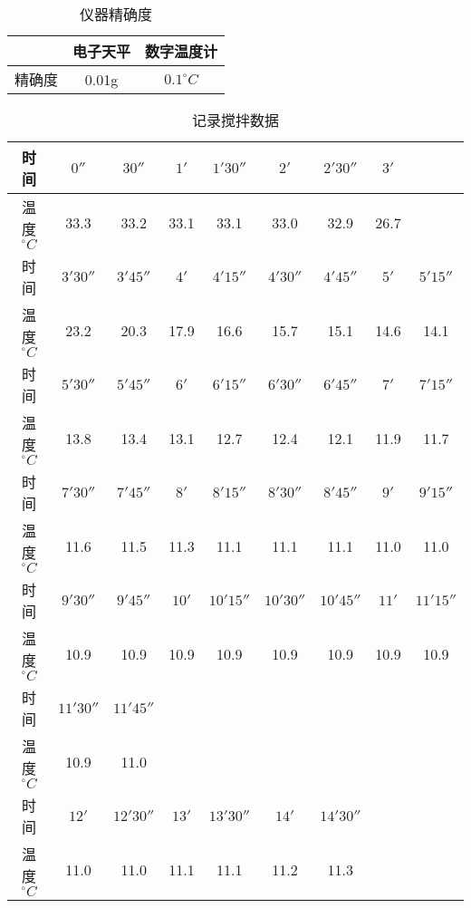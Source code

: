 \documentclass[UTF8]{ctexart}
\begin{document}
\begin{table}[H]
\centering
\caption{仪器精确度}
\begin{tabular}{|c|c|c|}
\hline
     & 电子天平 & 数字温度计 \\
\hline
     精确度 & 0.01g & $0.1^{\circ}C$ \\
\hline 
\end{tabular}
\end{table}

\begin{table}[H]
\centering
\caption{记录搅拌数据}
\begin{tabular}{|c|c|c|c|c|c|c|c|c|}
\hline
    时间 & $0''$ & $30''$ & $1'$ & $1'30''$ &  $2'$ & $2'30''$  & $3'$  &   \\
\hline
    温度$^{\circ}C$ & 33.3 & 33.2 & 33.1 & 33.1 & 33.0  &  32.9 & 26.7  &    \\
\hline
    时间 & $3'30''$ & $3'45''$ & $4'$ &$4'15''$ &  $4'30''$ & $4'45''$  & $5'$ & $5'15''$  \\
\hline
    温度$^{\circ}C$ & 23.2 & 20.3 & 17.9 & 16.6 & 15.7  & 15.1  &  14.6   &14.1  \\
\hline
  时间  & $5'30''$ & $5'45''$ & $6'$ &  $6'15''$ & $6'30''$  & $6'45''$ & $7'$  & $7'15''$ \\
\hline
    温度$^{\circ}C$ & 13.8 & 13.4 & 13.1 & 12.7  & 12.4  &  12.1  &  11.9 & 11.7 \\
\hline
  时间  & $7'30''$ & $7'45''$ & $8'$ &  $8'15''$ & $8'30''$  & $8'45''$ & $9'$  & $9'15''$ \\
\hline
    温度$^{\circ}C$  & 11.6 & 11.5 & 11.3  & 11.1  &  11.1   & 11.1 & 11.0 & 11.0  \\
\hline
  时间  & $9'30''$ & $9'45''$ & $10'$ &  $10'15''$ & $10'30''$  & $10'45''$ & $11'$  & $11'15''$ \\
\hline
    温度$^{\circ}C$  & 10.9 & 10.9  & 10.9  & 10.9  & 10.9&10.9 & 10.9& 10.9   \\
\hline
  时间  & $11'30''$ & $11'45''$ &  &  &   & &  &  \\
\hline
    温度$^{\circ}C$  & 10.9 & 11.0 &   &  & & & &     \\
\hline
  时间  & $12'$ & $12'30''$ & $13'$ &  $13'30''$ & $14'$  & $14'30''$ &  &  \\
\hline
    温度$^{\circ}C$ & 11.0 & 11.0 & 11.1 & 11.1 & 11.2  & 11.3  &    &   \\
\hline
\end{tabular}
\end{table}
\end{document}
